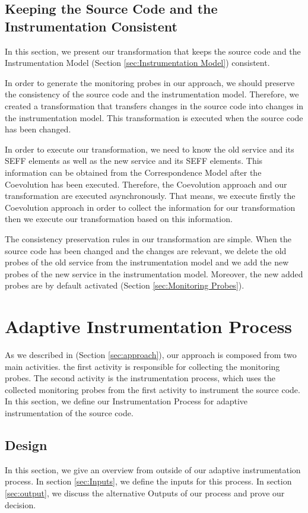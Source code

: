 \subsection{Keeping the Source Code and the Instrumentation Consistent}
\label{sec:Keeping the Source Code and the Instrumentation Consistent}
In this section, we present our transformation that keeps the source code and the Instrumentation Model (Section \ref{sec:Instrumentation Model}) consistent.

In order to generate the monitoring probes in our approach, we should preserve the consistency of the source code and the instrumentation model. Therefore, we created a transformation that transfers changes in the source code into changes in the instrumentation model. This transformation is executed when the source code has been changed.

In order to execute our transformation, we need to know the old service and its SEFF elements as well as the new service and its SEFF elements. This information can be obtained from the Correspondence Model after the Coevolution has been executed. Therefore, the Coevolution approach and our transformation are executed asynchronously. That means, we execute firstly the Coevolution approach in order to collect the information for our transformation then we execute our transformation based on this information.

The consistency preservation rules in our transformation are simple. When the source code has been changed and the changes are relevant, we delete the old probes of the old service from the instrumentation model and we add the new probes of the new service in the instrumentation model. Moreover, the new added probes are by default activated (Section \ref{sec:Monitoring Probes}). 

\section{Adaptive Instrumentation Process}
\label{sec:Adaptive Instrumentation Process}
As we described in (Section \ref{sec:approach}), our approach is composed from two main activities. the first activity is responsible for collecting the monitoring probes. The second activity is the instrumentation process, which uses the collected monitoring probes from the first activity to instrument the source code. In this section, we define our Instrumentation Process for adaptive instrumentation of the source code.
 
\subsection{Design}
\label{sec:Design}
In this section, we give an overview from outside of our adaptive instrumentation process. In section \ref{sec:Inputs}, we define the inputs for this process. In section \ref{sec:output}, we discuss the alternative Outputs of our process and prove our decision. 
